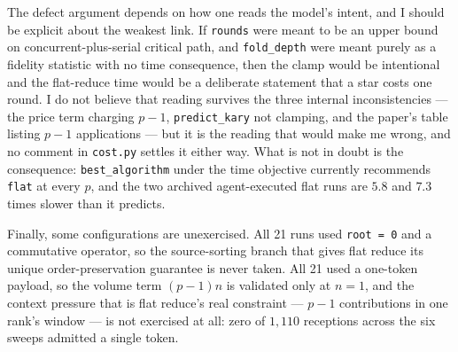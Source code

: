 \documentclass[11pt]{article}
\begin{document}
The defect argument depends on how one reads the model's intent, and I should be explicit about
the weakest link. If \texttt{rounds} were meant to be an upper bound on concurrent-plus-serial
critical path, and \texttt{fold\_depth} were meant purely as a fidelity statistic with no time
consequence, then the clamp would be intentional and the flat-reduce time would be a deliberate
statement that a star costs one round. I do not believe that reading survives the three
internal inconsistencies --- the price term charging $p-1$, \texttt{predict\_kary} not clamping,
and the paper's table listing $p-1$ applications --- but it is the reading that would make me
wrong, and no comment in \texttt{cost.py} settles it either way. What is not in doubt is the
consequence: \texttt{best\_algorithm} under the time objective currently recommends
\texttt{flat} at every $p$, and the two archived agent-executed flat runs are $5.8$ and $7.3$
times slower than it predicts.

Finally, some configurations are unexercised. All 21 runs used \texttt{root = 0} and a
commutative operator, so the source-sorting branch that gives flat reduce its unique
order-preservation guarantee is never taken. All 21 used a one-token payload, so the volume term
$(p-1)n$ is validated only at $n=1$, and the context pressure that is flat reduce's real
constraint --- $p-1$ contributions in one rank's window --- is not exercised at all: zero of
$1{,}110$ receptions across the six sweeps admitted a single token.
\end{document}
